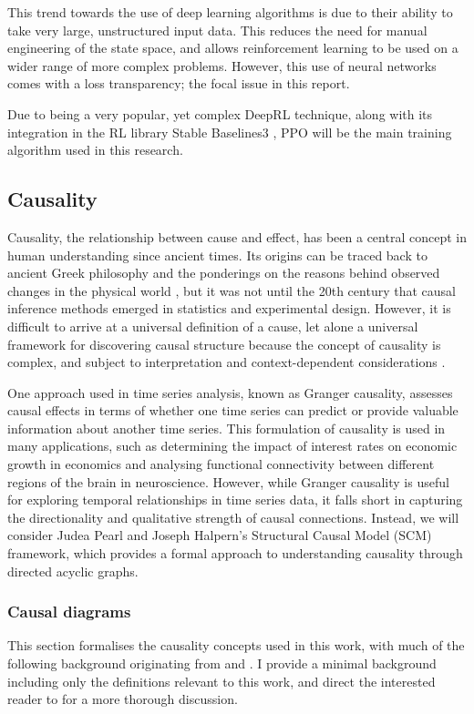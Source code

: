 \documentclass{article}
\begin{document}
This trend towards the use of deep learning algorithms is due to their ability to take very large, unstructured input data. This reduces the need for manual engineering of the state space, and allows reinforcement learning to be used on a wider range of more complex problems. However, this use of neural networks comes with a loss transparency; the focal issue in this report.


Due to being a very popular, yet complex DeepRL technique, along with its integration in the RL library Stable Baselines3 \cite{stable-baselines3}, PPO will be the main training algorithm used in this research. 



\subsection{Causality}

Causality, the relationship between cause and effect, has been a central concept in human understanding since ancient times. Its origins can be traced back to ancient Greek philosophy and the ponderings on the reasons behind observed changes in the physical world \cite{pearl2018book}, but it was not until the 20th century that causal inference methods emerged in statistics and experimental design. However, it is difficult to arrive at a universal definition of a cause, let alone a universal framework for discovering causal structure because the concept of causality is complex, and subject to interpretation and context-dependent considerations \cite{xie2019causality}.

One approach used in time series analysis, known as Granger causality, assesses causal effects in terms of whether one time series can predict or provide valuable information about another time series. This formulation of causality is used in many applications, such as determining the impact of interest rates on economic growth in economics and analysing functional connectivity between different regions of the brain in neuroscience.
However, while Granger causality is useful for exploring temporal relationships in time series data, it falls short in capturing the directionality and qualitative strength of causal connections. Instead, we will consider Judea Pearl and Joseph Halpern's  Structural Causal Model (SCM) \cite{halpern2005causes1} framework, which provides a formal approach to understanding causality through directed acyclic graphs.


\subsubsection{Causal diagrams}
This section formalises the causality concepts used in this work, with much of the following background originating from \cite{halpern2005causes1} and \cite{halpern2005causes2}. I provide a minimal background including only the definitions relevant to this work, and direct the interested reader to \cite{pearl2009causality} for a more thorough discussion. 
\end{document}
